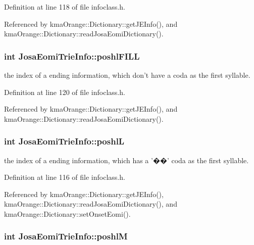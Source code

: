 Definition at line 118 of file infoclass.h.

Referenced by kmaOrange::Dictionary::getJEInfo(), and kmaOrange::Dictionary::readJosaEomiDictionary().\hypertarget{classJosaEomiTrieInfo_a43c431b8ca6cad51b0e7e0f4663749e}{
\subsubsection[{poshlFILL}]{\setlength{\rightskip}{0pt plus 5cm}int {\bf JosaEomiTrieInfo::poshlFILL}}}
\label{classJosaEomiTrieInfo_a43c431b8ca6cad51b0e7e0f4663749e}


the index of a ending information, which don't have a coda as the first syllable. 



Definition at line 120 of file infoclass.h.

Referenced by kmaOrange::Dictionary::getJEInfo(), and kmaOrange::Dictionary::readJosaEomiDictionary().\hypertarget{classJosaEomiTrieInfo_fd2d03bf4a3296e04d6d481b0ddf2f73}{
\subsubsection[{poshlL}]{\setlength{\rightskip}{0pt plus 5cm}int {\bf JosaEomiTrieInfo::poshlL}}}
\label{classJosaEomiTrieInfo_fd2d03bf4a3296e04d6d481b0ddf2f73}


the index of a ending information, which has a '��' coda as the first syllable. 



Definition at line 116 of file infoclass.h.

Referenced by kmaOrange::Dictionary::getJEInfo(), kmaOrange::Dictionary::readJosaEomiDictionary(), and kmaOrange::Dictionary::setOnsetEomi().\hypertarget{classJosaEomiTrieInfo_b4804002b12abfb9705b0f249ad98637}{
\subsubsection[{poshlM}]{\setlength{\rightskip}{0pt plus 5cm}int {\bf JosaEomiTrieInfo::poshlM}}}
\label{classJosaEomiTrieInfo_b4804002b12abfb9705b0f249ad98637}


